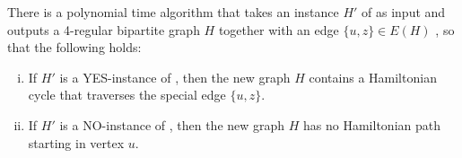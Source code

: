 \begin{lemma}
\label{le:Ham-to-Ham}
There is a polynomial time algorithm that takes an instance $H'$ of {\xxxHAM} as input and outputs 
a 4-regular bipartite graph $H$ together with an edge $\{u,z\}\in E(H)$ ,
so that the following holds:
\begin{enumerate}[(i)]
\item If $H'$ is a YES-instance of {\xxxHAM}, then the new graph $H$ contains a Hamiltonian cycle 
that traverses the special edge $\{u,z\}$.
\item If $H'$ is a NO-instance of {\xxxHAM}, then the new graph $H$ has no Hamiltonian path
starting in vertex $u$. 
\end{enumerate}
\end{lemma}

